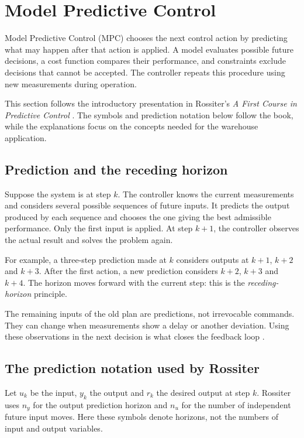 ﻿\section{Model Predictive Control}
\label{sec:mpc-theory}

Model Predictive Control (MPC) chooses the next control action by predicting what may happen after that action is applied. A model evaluates possible future decisions, a cost function compares their performance, and constraints exclude decisions that cannot be accepted. The controller repeats this procedure using new measurements during operation.

This section follows the introductory presentation in Rossiter's \textit{A First Course in Predictive Control} \cite[Sections 1.6--1.7]{Rossiter2018}. The symbols and prediction notation below follow the book, while the explanations focus on the concepts needed for the warehouse application.

\subsection{Prediction and the receding horizon}

Suppose the system is at step $k$. The controller knows the current measurements and considers several possible sequences of future inputs. It predicts the output produced by each sequence and chooses the one giving the best admissible performance. Only the first input is applied. At step $k+1$, the controller observes the actual result and solves the problem again.

For example, a three-step prediction made at $k$ considers outputs at $k+1$, $k+2$ and $k+3$. After the first action, a new prediction considers $k+2$, $k+3$ and $k+4$. The horizon moves forward with the current step: this is the \emph{receding-horizon} principle.

The remaining inputs of the old plan are predictions, not irrevocable commands. They can change when measurements show a delay or another deviation. Using these observations in the next decision is what closes the feedback loop \cite[Section 1.6.3]{Rossiter2018}.

\subsection{The prediction notation used by Rossiter}

Let $u_k$ be the input, $y_k$ the output and $r_k$ the desired output at step $k$. Rossiter uses $n_y$ for the output prediction horizon and $n_u$ for the number of independent future input moves. Here these symbols denote horizons, not the numbers of input and output variables.

